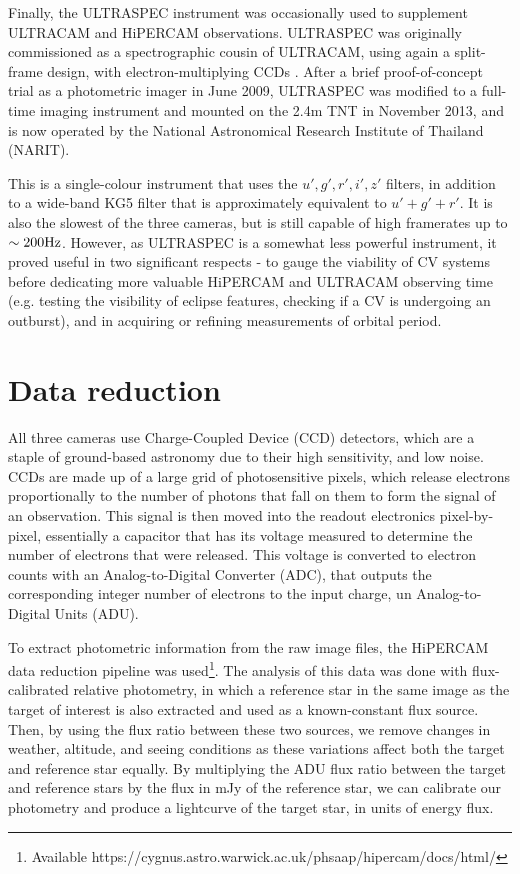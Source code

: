 Finally, the ULTRASPEC instrument was occasionally used to supplement ULTRACAM and HiPERCAM observations. ULTRASPEC was originally commissioned as a spectrographic cousin of ULTRACAM, using again a split-frame design, with electron-multiplying CCDs \citep{dhillon2014}. 
After a brief proof-of-concept trial as a photometric imager in June 2009, ULTRASPEC was modified to a full-time imaging instrument and mounted on the 2.4m TNT in November 2013, and is now operated by the National Astronomical Research Institute of Thailand (NARIT).

This is a single-colour instrument that uses the $u',g',r',i',z'$ filters, in addition to a wide-band KG5 filter that is approximately equivalent to $u' + g' + r'$. It is also the slowest of the three cameras, but is still capable of high framerates up to $\sim 200 \rm Hz$. However, as ULTRASPEC is a somewhat less powerful instrument, it proved useful in two significant respects - to gauge the viability of CV systems before dedicating more valuable HiPERCAM and ULTRACAM observing time (e.g. testing the visibility of eclipse features, checking if a CV is undergoing an outburst), and in acquiring or refining measurements of orbital period.


\section{Data reduction}
\label{sect:data reduction}

All three cameras use Charge-Coupled Device (CCD) detectors, which are a staple of ground-based astronomy due to their high sensitivity, and low noise.
CCDs are made up of a large grid of photosensitive pixels, which release electrons proportionally to the number of photons that fall on them to form the signal of an observation. This signal is then moved into the readout electronics pixel-by-pixel, essentially a capacitor that has its voltage measured to determine the number of electrons that were released. This voltage is converted to electron counts with an Analog-to-Digital Converter (ADC), that outputs the corresponding integer number of electrons to the input charge, un Analog-to-Digital Units (ADU).

To extract photometric information from the raw image files, the HiPERCAM data reduction pipeline was used\footnote{Available https://cygnus.astro.warwick.ac.uk/phsaap/hipercam/docs/html/}. 
The analysis of this data was done with flux-calibrated relative photometry, in which a reference star in the same image as the target of interest is also extracted and used as a known-constant flux source. Then, by using the flux ratio between these two sources, we remove changes in weather, altitude, and seeing conditions as these variations affect both the target and reference star equally. By multiplying the ADU flux ratio between the target and reference stars by the flux in mJy of the reference star, we can calibrate our photometry and produce a lightcurve of the target star, in units of energy flux.


